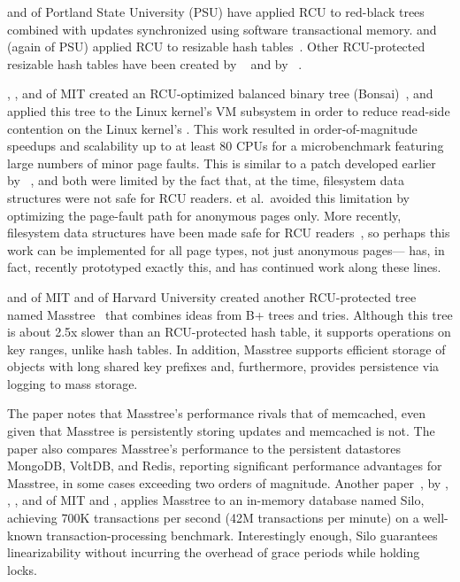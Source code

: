  and  of Portland State University
(PSU) have
applied RCU to red-black
trees~\cite{PhilHowardPhD,PhilHoward2011RCUTMRBTree} combined with updates
synchronized using software transactional memory.
 and  (again of PSU)
applied RCU to resizable
hash tables~\cite{JoshTriplettPhD,Triplett:2011:RPHash,JonCorbet2014RCUhash1,JonCorbet2014RCUhash2}.
Other RCU-protected resizable hash tables have been created by
~\cite{HerbertXu2010RCUResizeHash} and by
~\cite{PaulMcKenney2013LWNURCUhash}.

, , and 
of MIT created an RCU-optimized balanced binary tree
(Bonsai)~\cite{AustinClements2012RCULinux:mmapsem}, and applied this
tree to the Linux kernel's VM subsystem in order to reduce read-side
contention on the Linux kernel's .
This work resulted in order-of-magnitude speedups and scalability up to
at least 80 CPUs for a microbenchmark featuring large numbers of minor
page faults.
This is similar to a patch developed earlier by
~\cite{PeterZijlstra2014SpeculativePageFault}, and both
were limited by the fact that, at the time, filesystem data structures
were not safe for RCU readers.
 et al.\ avoided this limitation by
optimizing the page-fault
path for anonymous pages only.
More recently, filesystem data structures have been made safe for RCU
readers~\cite{JonathanCorbet2010dcacheRCU,JonathanCorbet2011dcacheRCUbug},
so perhaps this work can be implemented for all page types, not just
anonymous pages--- has, in fact, recently prototyped
exactly this, and  has continued work along these lines.

 and  of MIT and  of
Harvard University created another RCU-protected tree named
Masstree~\cite{Mao:2012:CCF:2168836.2168855} that combines ideas from B+
trees and tries.
Although this tree is about 2.5x slower than an RCU-protected hash table,
it supports operations on key ranges, unlike hash tables.
In addition, Masstree supports efficient storage of objects with long
shared key prefixes and, furthermore, provides persistence via logging
to mass storage.

The paper notes that Masstree's performance rivals that of memcached, even
given that Masstree is persistently storing updates and memcached is not.
The paper also compares Masstree's performance to the persistent
datastores MongoDB, VoltDB, and Redis, reporting significant performance
advantages for Masstree, in some cases exceeding two orders of magnitude.
Another paper~\cite{Tu:2013:STM:2517349.2522713}, by ,
, , and 
of MIT and ,
applies Masstree to an in-memory database named Silo, achieving 700K
transactions per second (42M transactions per minute) on a well-known
transaction-processing benchmark.
Interestingly enough, Silo guarantees linearizability without incurring
the overhead of grace periods while holding locks.

